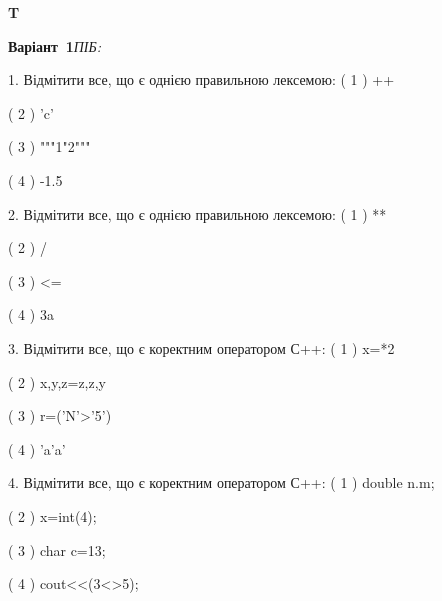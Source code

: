 \documentclass[11pt]{article}
\begin{document}
{\large\textbf{T}}

\textbf{Варіант \No\,1}\hfill \textit{ПІБ:}\,\underline{\hspace{60mm}}
\vspace{4mm}

1. %
Відмітити все, що є однією правильною лексемою:
( 1 ) ++

( 2 ) 'c'

( 3 ) """1"2"""

( 4 ) -1.5

2. %
Відмітити все, що є однією правильною лексемою:
( 1 ) **

( 2 ) /

( 3 ) <=

( 4 ) 3a

3. %
Відмітити все, що є коректним оператором С++:
( 1 ) x=*2

( 2 ) x,y,z=z,z,y

( 3 ) r=('N'>'5')

( 4 ) 'a'a'

4. %
Відмітити все, що є коректним оператором С++:
( 1 ) double n.m;

( 2 ) x=int(4);

( 3 ) char c=13;

( 4 ) cout<<(3<>5);





\newpage
\end{document}
